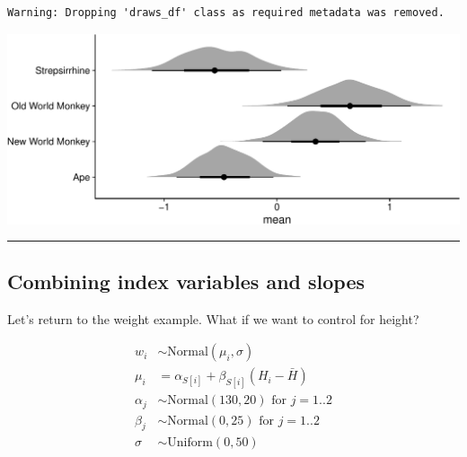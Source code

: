 \documentclass[
  letterpaper,
  DIV=11,
  numbers=noendperiod]{scrartcl}
\begin{document}
\begin{verbatim}
Warning: Dropping 'draws_df' class as required metadata was removed.
\end{verbatim}

\includegraphics[width=25in,height=\textheight]{lecture02-2_files/figure-pdf/unnamed-chunk-14-1.pdf}

\begin{center}\rule{0.5\linewidth}{0.5pt}\end{center}

\subsection{Combining index variables and
slopes}\label{combining-index-variables-and-slopes}

Let's return to the weight example. What if we want to control for
height?

\begin{align*}
w_i &\sim \text{Normal}(\mu_i, \sigma) \\
\mu_i &= \alpha_{S[i]} + \beta_{S[i]}(H_i-\bar{H})\\
\alpha_j &\sim \text{Normal}(130, 20)\text{ for }j = 1..2 \\
\beta_j &\sim \text{Normal}(0, 25)\text{ for }j = 1..2 \\
\sigma &\sim \text{Uniform}(0, 50)
\end{align*}
\end{document}
